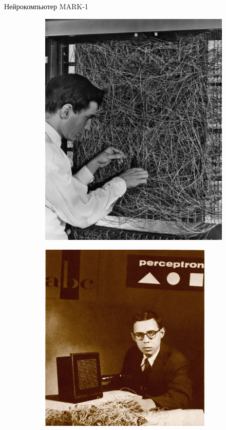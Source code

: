 \documentclass[10pt]{beamer}
\begin{document}
\begin{frame}{Нейрокомпьютер MARK-1}

\begin{figure}
        \centering
        \begin{subfigure}[b]{0.4\textwidth}
                \includegraphics[width=\textwidth]{images/rosenblatt1.jpg}
        \end{subfigure}%
        \begin{subfigure}[b]{0.5\textwidth}
                \includegraphics[width=0.9\textwidth]{images/rosenblatt2.jpg}

\end{subfigure}
\end{figure}
\end{frame}
\end{document}

